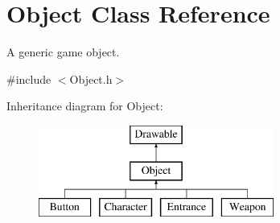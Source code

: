 \hypertarget{class_object}{}\section{Object Class Reference}
\label{class_object}


A generic game object.  




{\ttfamily \#include $<$Object.\+h$>$}

Inheritance diagram for Object\+:\begin{figure}[H]
\begin{center}
\leavevmode
\includegraphics[height=3.000000cm]{class_object}
\end{center}
\end{figure}
